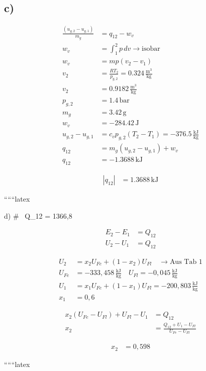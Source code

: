\subsection*{c)}

\begin{align*}
\frac{(u_{g,2} - u_{g,1})}{m_g} &= q_{12} - w_v \\
w_v &= \int_{1}^{2} p \, dv \rightarrow \text{isobar} \\
w_v &= mp(v_2 - v_1) \\
v_2 &= \frac{RT_2}{p_{g,2}} = 0.324 \, \frac{\text{m}^3}{\text{kg}} \\
v_2 &= 0.9182 \, \frac{\text{m}^3}{\text{kg}} \\
p_{g,2} &= 1.4 \, \text{bar} \\
m_g &= 3.42 \, \text{g} \\
w_v &= -284.42 \, \text{J} \\
u_{g,2} - u_{g,1} &= c_v p_{g,2} (T_2 - T_1) = -376.5 \, \frac{\text{kJ}}{\text{kg}} \\
q_{12} &= m_g (u_{g,2} - u_{g,1}) + w_v \\
q_{12} &= -1.3688 \, \text{kJ}
\end{align*}

\begin{align*}
|q_{12}| &= 1.3688 \, \text{kJ}
\end{align*}

``````latex

d) \quad \# \, Q_{12} = 1366,8 \, 

\begin{align*}
E_2 - E_1 &= Q_{12} \\
U_2 - U_1 &= Q_{12}
\end{align*}

\begin{align*}
U_2 &= x_2 U_{Fe} + (1 - x_2) U_{Fl} \quad \rightarrow \text{Aus Tab 1} \\
U_{Fe} &= -333,458 \, \frac{\text{kJ}}{\text{kg}} \quad U_{Fl} = -0,045 \, \frac{\text{kJ}}{\text{kg}} \\
U_1 &= x_1 U_{Fe} + (1 - x_1) U_{Fl} = -200,803 \, \frac{\text{kJ}}{\text{kg}} \\
x_1 &= 0,6
\end{align*}

\begin{align*}
x_2 (U_{Fe} - U_{Fl}) + U_{Fl} - U_1 &= Q_{12} \\
x_2 &= \frac{Q_{12} + U_1 - U_{Fl}}{U_{Fe} - U_{Fl}}
\end{align*}

\begin{align*}
x_2 &= 0,598
\end{align*}

``````latex


